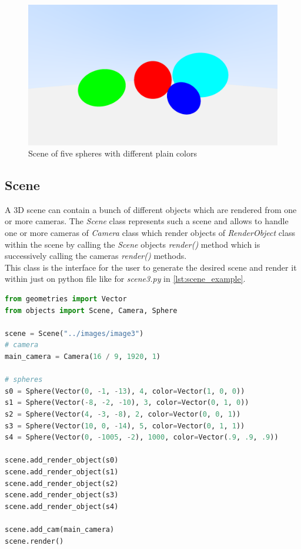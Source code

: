 \documentclass[]{article}
\begin{document}
	\begin{figure}[h]
		\centering
		\includegraphics[width=0.9\linewidth]{image3}
		\caption{Scene of five spheres with different plain colors}
		\label{fig:image3}
	\end{figure}

	\subsection{Scene}
	\label{sec:scene}
	A 3D scene can contain a bunch of different objects which are rendered from one or more cameras. The \emph{Scene} class represents such a scene and allows to handle one or more cameras of \emph{Camera} class which render objects of \emph{RenderObject} class within the scene by calling the \emph{Scene} objects \emph{render()} method which is successively calling the cameras \emph{render()} methods. 
	\\
	This class is the interface for the user to generate the desired scene and render it within just on python file like for \emph{scene3.py} in \cref{lst:scene_example}.
	\begin{lstlisting}[caption={Example for Scene class usage from scene3.py}, language=Python, label=lst:scene_example]
from geometries import Vector
from objects import Scene, Camera, Sphere

scene = Scene("../images/image3")
# camera
main_camera = Camera(16 / 9, 1920, 1)

# spheres
s0 = Sphere(Vector(0, -1, -13), 4, color=Vector(1, 0, 0))
s1 = Sphere(Vector(-8, -2, -10), 3, color=Vector(0, 1, 0))
s2 = Sphere(Vector(4, -3, -8), 2, color=Vector(0, 0, 1))
s3 = Sphere(Vector(10, 0, -14), 5, color=Vector(0, 1, 1))
s4 = Sphere(Vector(0, -1005, -2), 1000, color=Vector(.9, .9, .9))

scene.add_render_object(s0)
scene.add_render_object(s1)
scene.add_render_object(s2)
scene.add_render_object(s3)
scene.add_render_object(s4)

scene.add_cam(main_camera)
scene.render()
	\end{lstlisting}
	
\end{document}
